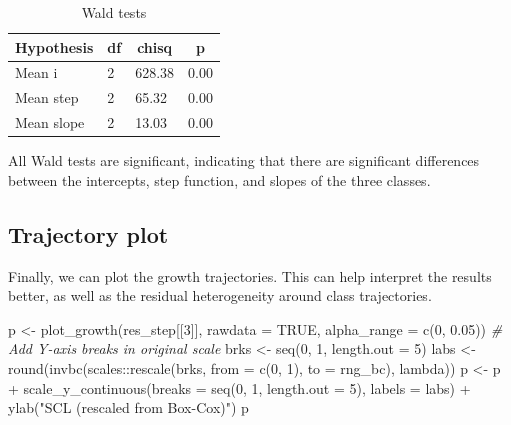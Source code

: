 \documentclass[
  man,floatsintext]{apa6}
\newenvironment{Shaded}{\begin{snugshade}}{\end{snugshade}}
\newcommand{\AttributeTok}[1]{\textcolor[rgb]{0.77,0.63,0.00}{#1}}
\newcommand{\CommentTok}[1]{\textcolor[rgb]{0.56,0.35,0.01}{\textit{#1}}}
\newcommand{\ConstantTok}[1]{\textcolor[rgb]{0.00,0.00,0.00}{#1}}
\newcommand{\DecValTok}[1]{\textcolor[rgb]{0.00,0.00,0.81}{#1}}
\newcommand{\FloatTok}[1]{\textcolor[rgb]{0.00,0.00,0.81}{#1}}
\newcommand{\FunctionTok}[1]{\textcolor[rgb]{0.00,0.00,0.00}{#1}}
\newcommand{\NormalTok}[1]{#1}
\newcommand{\OtherTok}[1]{\textcolor[rgb]{0.56,0.35,0.01}{#1}}
\newcommand{\SpecialCharTok}[1]{\textcolor[rgb]{0.00,0.00,0.00}{#1}}
\newcommand{\StringTok}[1]{\textcolor[rgb]{0.31,0.60,0.02}{#1}}
\begin{document}
\begin{table}[tbp]

\begin{center}
\begin{threeparttable}

\caption{\label{tab:waldtests}Wald tests}

\begin{tabular}{llll}
\toprule
Hypothesis & \multicolumn{1}{c}{df} & \multicolumn{1}{c}{chisq} & \multicolumn{1}{c}{p}\\
\midrule
Mean i & 2 & 628.38 & 0.00\\
Mean step & 2 & 65.32 & 0.00\\
Mean slope & 2 & 13.03 & 0.00\\
\bottomrule
\end{tabular}

\end{threeparttable}
\end{center}

\end{table}

All Wald tests are significant, indicating that there are significant differences between the intercepts, step function, and slopes of the three classes.

\hypertarget{trajectory-plot}{%
\subsection{Trajectory plot}\label{trajectory-plot}}

Finally, we can plot the growth trajectories.
This can help interpret the results better,
as well as the residual heterogeneity around class trajectories.

\begin{Shaded}
\begin{Highlighting}[]
\NormalTok{p }\OtherTok{\textless{}{-}} \FunctionTok{plot\_growth}\NormalTok{(res\_step[[}\DecValTok{3}\NormalTok{]], }\AttributeTok{rawdata =} \ConstantTok{TRUE}\NormalTok{, }\AttributeTok{alpha\_range =} \FunctionTok{c}\NormalTok{(}\DecValTok{0}\NormalTok{,}
    \FloatTok{0.05}\NormalTok{))}
\CommentTok{\# Add Y{-}axis breaks in original scale}
\NormalTok{brks }\OtherTok{\textless{}{-}} \FunctionTok{seq}\NormalTok{(}\DecValTok{0}\NormalTok{, }\DecValTok{1}\NormalTok{, }\AttributeTok{length.out =} \DecValTok{5}\NormalTok{)}
\NormalTok{labs }\OtherTok{\textless{}{-}} \FunctionTok{round}\NormalTok{(}\FunctionTok{invbc}\NormalTok{(scales}\SpecialCharTok{::}\FunctionTok{rescale}\NormalTok{(brks, }\AttributeTok{from =} \FunctionTok{c}\NormalTok{(}\DecValTok{0}\NormalTok{, }\DecValTok{1}\NormalTok{), }\AttributeTok{to =}\NormalTok{ rng\_bc),}
\NormalTok{    lambda))}
\NormalTok{p }\OtherTok{\textless{}{-}}\NormalTok{ p }\SpecialCharTok{+} \FunctionTok{scale\_y\_continuous}\NormalTok{(}\AttributeTok{breaks =} \FunctionTok{seq}\NormalTok{(}\DecValTok{0}\NormalTok{, }\DecValTok{1}\NormalTok{, }\AttributeTok{length.out =} \DecValTok{5}\NormalTok{),}
    \AttributeTok{labels =}\NormalTok{ labs) }\SpecialCharTok{+} \FunctionTok{ylab}\NormalTok{(}\StringTok{"SCL (rescaled from Box{-}Cox)"}\NormalTok{)}
\NormalTok{p}
\end{Highlighting}
\end{Shaded}
\end{document}
